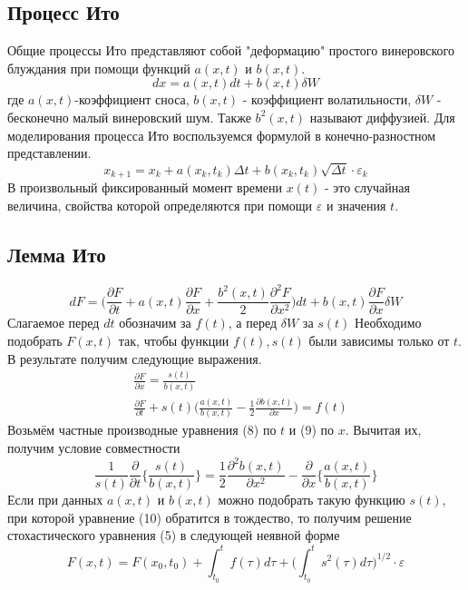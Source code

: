 \documentclass[12pt]{article}
\theoremstyle{definition}
\begin{document}
\subsection{Процесс Ито}
Общие процессы Ито представляют собой "деформацию" простого винеровского блуждания при помощи функций
$a(x,t)$ и $b(x,t)$.
\begin{equation}
  dx=a(x,t) dt+b(x,t) \delta W
\end{equation}
где $a(x,t)$-коэффициент сноса, $b(x,t)$ - коэффициент волатильности, $\delta W $ - бесконечно малый винеровский шум.
Также $b^2(x,t)$ называют диффузией. Для моделирования процесса Ито воспользуемся формулой в конечно-разностном представлении.
\begin{equation}
  x_{k+1}=x_k+a(x_k,t_k)\Delta t+b(x_k,t_k)\sqrt{\Delta t}\cdot\varepsilon_k
\end{equation}
В произвольный фиксированный момент времени $x(t)$ - это случайная величина, свойства которой определяются при помощи
 $\varepsilon$ и значения $t$.
 \subsection{Лемма Ито}
 \begin{equation}
   dF=\bigg(\frac{\partial F}{\partial t}+a(x,t)\frac{\partial F}{\partial x}+
   \frac{b^2(x,t)}{2}\frac{\partial^2 F}{\partial x^2}\bigg)dt+
   b(x,t)\frac{\partial F}{\partial x}\delta W
 \end{equation}
Слагаемое перед $dt$ обозначим за $f(t)$, а перед $\delta W$ за $s(t)$
Необходимо подобрать $F(x, t)$ так, чтобы функции $f(t), s(t)$ были зависимы только от $t$.
В результате получим следующие выражения.
\begin{align}
  &\frac{\partial F}{\partial x}=\frac{s(t)}{b(x,t)}\\
  &\frac{\partial F}{\partial t}+s(t)\bigg(\frac{a(x,t)}{b(x,t)}-\frac{1}{2}\frac{\partial b(x,t)}{\partial x}\bigg)=f(t)
\end{align}
Возьмём частные производные уравнения (8) по $t$ и (9) по $x$. Вычитая их, получим условие совместности
\begin{equation}
 \frac{1}{s(t)}\frac{\partial}{\partial t}\bigg\{\frac{s(t)}{b(x,t)}\bigg\}=
 \frac{1}{2}\frac{\partial^2 b(x,t)}{\partial x^2}-\frac{\partial}{\partial x}\bigg\{\frac{a(x,t)}{b(x,t)}\bigg\}
\end{equation}
Если при данных $a(x,t)$ и $b(x,t)$ можно подобрать такую функцию $s(t)$,
 при которой уравнение (10) обратится в тождество, то получим решение стохастического уравнения (5) в следующей неявной форме
 \begin{equation}
  F(x,t)=F(x_0,t_0)+\int_{t_0}^tf(\tau)d\tau + \bigg(\int_{t_0}^ts^2(\tau)d\tau\bigg)^{1/2}\cdot\varepsilon
 \end{equation}
\end{document}
